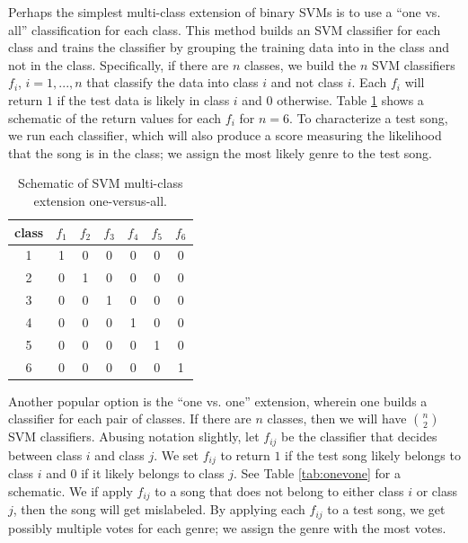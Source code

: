 \documentclass[12pt]{article}
\begin{document}
Perhaps the simplest multi-class extension of binary SVMs is to use a ``one vs. all'' classification for each class.  This method builds an SVM classifier for each class and trains the classifier by grouping the training data into in the class and not in the class.  Specifically, if there are $n$ classes, we build the $n$ SVM classifiers $f_i$, $i=1,...,n$ that classify the data into class $i$ and not class $i$.  Each $f_i$ will return $1$ if the test data is likely in class $i$ and $0$ otherwise.  Table \ref{tab:onevall} shows a schematic of the return values for each $f_i$ for $n=6$.  To characterize a test song, we run each classifier, which will also produce a score measuring the likelihood that the song is in the class; we assign the most likely genre to the test song.\\

\begin{table}[h!]
   \centering
   \begin{tabular}{|c|cccccc|}
      \hline
      class&$f_1$ & $f_2$ & $f_3$ & $f_4$ & $f_5$ & $f_6$\\\hline
      1 & 1 & 0 & 0 & 0 &0 &0\\\hline
      2 & 0 & 1 & 0 & 0 & 0 & 0\\\hline
      3 & 0 & 0 & 1 & 0 & 0 & 0\\\hline
      4 & 0 & 0 & 0 & 1 & 0 & 0\\\hline
      5 & 0 & 0 & 0 & 0 & 1 & 0\\\hline
      6 & 0 & 0 & 0 & 0 & 0 & 1\\\hline
   \end{tabular}
   \caption{Schematic of SVM multi-class extension one-versus-all.}
   \label{tab:onevall}
\end{table}

Another popular option is the ``one vs. one'' extension, wherein one builds a classifier for each pair of classes.  If there are $n$ classes, then we will have $\binom n 2$ SVM classifiers.  Abusing notation slightly, let $f_{ij}$ be the classifier that decides between class $i$ and class $j$.  We set $f_{ij}$ to return $1$ if the test song likely belongs to class $i$ and $0$ if it likely belongs to class $j$.  See Table \ref{tab:onevone} for a schematic.  We if apply $f_{ij}$ to a song that does not belong to either class $i$ or class $j$, then the song will get mislabeled.  By applying each $f_{ij}$ to a test song, we get possibly multiple votes for each genre; we assign the genre with the most votes.\\
\end{document}

